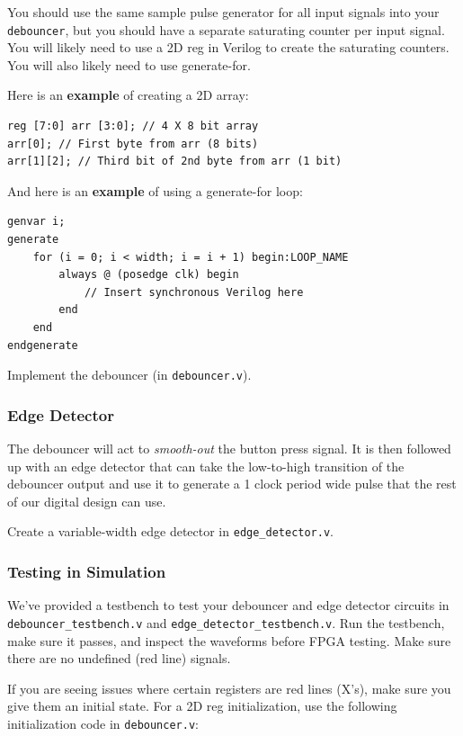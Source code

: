 \documentclass[11pt]{article}
\begin{document}
You should use the same sample pulse generator for all input signals into your \verb|debouncer|, but you should have a separate saturating counter per input signal. You will likely need to use a 2D reg in Verilog to create the saturating counters. You will also likely need to use generate-for.

Here is an \textbf{example} of creating a 2D array:

\begin{verbatim}
reg [7:0] arr [3:0]; // 4 X 8 bit array
arr[0]; // First byte from arr (8 bits)
arr[1][2]; // Third bit of 2nd byte from arr (1 bit)
\end{verbatim}

And here is an \textbf{example} of using a generate-for loop:

\begin{verbatim}
genvar i;
generate
	for (i = 0; i < width; i = i + 1) begin:LOOP_NAME
		always @ (posedge clk) begin
			// Insert synchronous Verilog here
		end
	end
endgenerate
\end{verbatim}

Implement the debouncer (in \verb|debouncer.v|).

\subsubsection{Edge Detector}

The debouncer will act to \emph{smooth-out} the button press signal. It is then followed up with an edge detector that can take the low-to-high transition of the debouncer output and use it to generate a 1 clock period wide pulse that the rest of our digital design can use.

Create a variable-width edge detector in \verb|edge_detector.v|. 

\subsubsection{Testing in Simulation}

We've provided a testbench to test your debouncer and edge detector circuits in \verb|debouncer_testbench.v| and \verb|edge_detector_testbench.v|. Run the testbench, make sure it passes, and inspect the waveforms before FPGA testing. Make sure there are no undefined (red line) signals.

If you are seeing issues where certain registers are red lines (X's), make sure you give them an initial state. For a 2D reg initialization, use the following initialization code in \verb|debouncer.v|:
\end{document}
